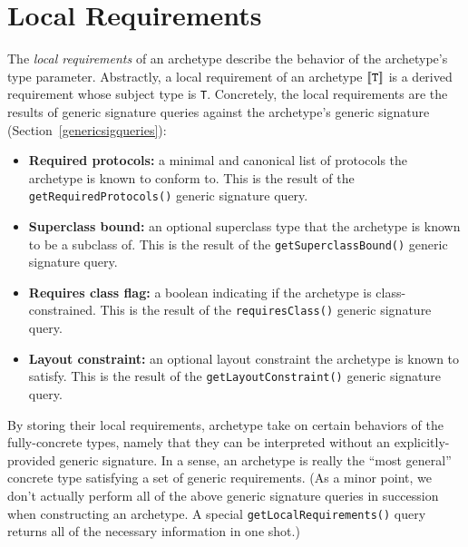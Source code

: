 \documentclass[../generics]{subfiles}
\begin{document}
\section{Local Requirements}\label{local requirements}

The \emph{local requirements} of an archetype describe the behavior of the archetype's type parameter. Abstractly, a local requirement of an archetype $[\![\texttt{T}]\!]$ is a derived requirement whose subject type is \texttt{T}. Concretely, the local requirements are the results of generic signature queries against the archetype's generic signature (Section~\ref{genericsigqueries}):
\begin{itemize}
\item \textbf{Required protocols:} a minimal and canonical list of protocols the archetype is known to conform to. This is the result of the \texttt{getRequiredProtocols()} generic signature query.
\item \textbf{Superclass bound:} an optional superclass type that the archetype is known to be a subclass of. This is the result of the \texttt{getSuperclassBound()} generic signature query.
\item \textbf{Requires class flag:} a boolean indicating if the archetype is class-constrained. This is the result of the \texttt{requiresClass()} generic signature query.
\item \textbf{Layout constraint:} an optional layout constraint the archetype is known to satisfy. This is the result of the \texttt{getLayoutConstraint()} generic signature query.
\end{itemize}
By storing their local requirements, archetype take on certain behaviors of the fully-concrete types, namely that they can be interpreted without an explicitly-provided generic signature. In a sense, an archetype is really the ``most general'' concrete type satisfying a set of generic requirements. (As a minor point, we don't actually perform all of the above generic signature queries in succession when constructing an archetype. A special \texttt{getLocalRequirements()} query returns all of the necessary information in one shot.)
\end{document}
